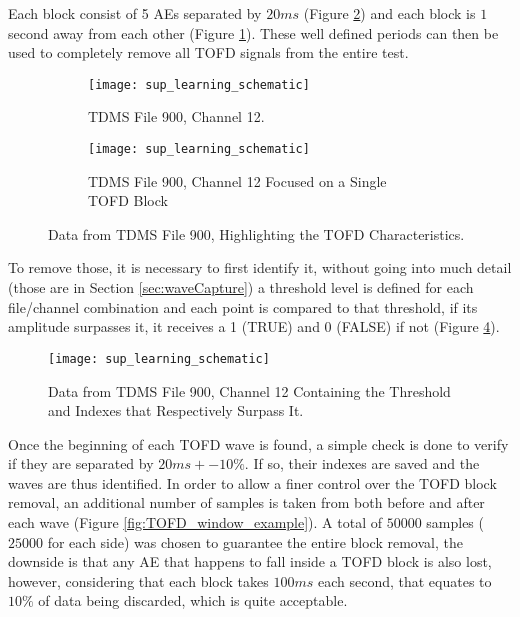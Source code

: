 Each block consist of 5 AEs separated by $20 ms$ (Figure \ref{fig:TOFD_example_b}) and each block is $1$ second away from each other (Figure \ref{fig:TOFD_example_a}). These well defined periods can then be used to completely remove all TOFD signals from the entire test.

\begin{figure}[H]
	\centering
	\begin{subfigure}{.5\textwidth}
		\texttt{[image: sup\_learning\_schematic]}
		\caption{TDMS File 900, Channel 12.}
		\label{fig:TOFD_example_a}
	\end{subfigure}%
	\begin{subfigure}{.5\textwidth}
		\texttt{[image: sup\_learning\_schematic]}
		\caption{TDMS File 900, Channel 12 Focused on a Single TOFD Block}
		\label{fig:TOFD_example_b}
	\end{subfigure}
	\caption{Data from TDMS File 900, Highlighting the TOFD Characteristics.}
	\label{fig:TOFD_example}
\end{figure}

To remove those, it is necessary to first identify it, without going into much detail (those are in Section \ref{sec:waveCapture}) a threshold level is defined for each file/channel combination and each point is compared to that threshold, if its amplitude surpasses it, it receives a 1 (TRUE) and 0 (FALSE) if not (Figure \ref{fig:TOFD_thr_example}).

\begin{figure}[H]
	\centering
	\texttt{[image: sup\_learning\_schematic]}
	\caption{Data from TDMS File 900, Channel 12 Containing the Threshold and Indexes that Respectively Surpass It.}
	\label{fig:TOFD_thr_example}
\end{figure}

Once the beginning of each TOFD wave is found, a simple check is done to verify if they are separated by $20 ms +- 10\%$. If so, their indexes are saved and the waves are thus identified. In order to allow a finer control over the TOFD block removal, an additional number of samples is taken from both before and after each wave (Figure \ref{fig:TOFD_window_example}). A total of $50000$ samples ($25000$ for each side) was chosen to guarantee the entire block removal, the downside is that any AE that happens to fall inside a TOFD block is also lost, however, considering that each block takes $100 ms$ each second, that equates to $10\%$ of data being discarded, which is quite acceptable.

